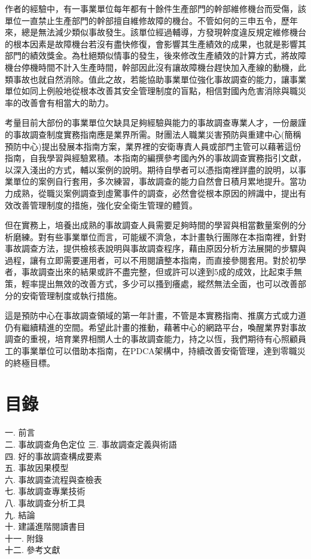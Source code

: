 \documentclass[
  letterpaper,
  DIV=11,
  numbers=noendperiod]{scrreprt}
\begin{document}
作者的經驗中，有一事業單位每年都有十餘件生產部門的幹部維修機台而受傷，該單位一直禁止生產部門的幹部擅自維修故障的機台。不管如何的三申五令，歷年來，總是無法減少類似事故發生。該單位經過輔導，方發現幹度違反規定維修機台的根本因素是故障機台若沒有盡快修復，會影響其生產績效的成果，也就是影響其部門的績效獎金。為杜絕類似情事的發生，後來修改生產績效的計算方式，將故障機台停機時間不計入生產時間，幹部因此沒有讓故障機台趕快加入產線的動機，此類事故也就自然消除。值此之故，若能協助事業單位強化事故調查的能力，讓事業單位如同上例般地從根本改善其安全管理制度的盲點，相信對國內危害消除與職災率的改善會有相當大的助力。

考量目前大部份的事業單位欠缺具足夠經驗與能力的事故調查專業人才，一份嚴謹的事故調查制度實務指南應是業界所需。財團法人職業災害預防與重建中心(簡稱預防中心)提出發展本指南方案，業界裡的安衛專責人員或部門主管可以藉著這份指南，自我學習與經驗累積。本指南的編撰參考國內外的事故調查實務指引文獻，以深入淺出的方式，輔以案例的說明。期待自學者可以憑指南裡詳盡的說明，以事業單位的案例自行套用，多次練習，事故調查的能力自然會日積月累地提升。當功力成熟，從職災案例調查到虛驚事件的調查，必然會從根本原因的辨識中，提出有效改善管理制度的措施，強化安全衛生管理的體質。

但在實務上，培養出成熟的事故調查人員需要足夠時間的學習與相當數量案例的分析磨練。對有些事業單位而言，可能緩不濟急，本計畫執行團隊在本指南裡，針對事故調查方法，提供檢核表說明與事故調查程序，藉由原因分析方法展開的步驟與過程，讓有立即需要運用者，可以不用閱讀整本指南，而直接參閱套用。對於初學者，事故調查出來的結果或許不盡完整，但或許可以達到5成的成效，比起束手無策，輕率提出無效的改善方式，多少可以搔到癢處，縱然無法全面，也可以改善部分的安衛管理制度或執行措施。

這是預防中心在事故調查領域的第一年計畫，不管是本實務指南、推廣方式或力道仍有繼續精進的空間。希望此計畫的推動，藉著中心的網路平台，喚醒業界對事故調查的重視，培育業界相關人士的事故調查能力，持之以恆，我們期待有心照顧員工的事業單位可以借助本指南，在PDCA架構中，持續改善安衛管理，達到零職災的終極目標。


\chapter*{目錄}\label{ux76eeux9304}


一. 前言\\
二. 事故調查角色定位 三. 事故調查定義與術語\\
四. 好的事故調查構成要素\\
五. 事故因果模型\\
六. 事故調查流程與查檢表\\
七. 事故調查專業技術\\
八. 事故調查分析工具\\
九. 結論\\
十. 建議進階閱讀書目\\
十一. 附錄\\
十二. 參考文獻
\end{document}
